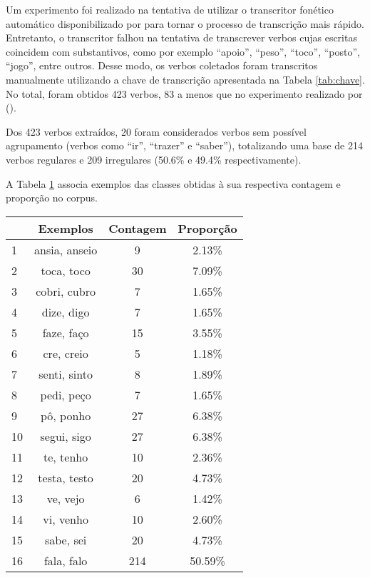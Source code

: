  Um experimento foi realizado na tentativa de utilizar o transcritor fonético automático disponibilizado por \cite{guide:2016} para tornar o processo de transcrição mais rápido. Entretanto, o transcritor falhou na tentativa de transcrever verbos cujas escritas coincidem com substantivos, como por exemplo “apoio”, “peso”, “toco”, “posto”, “jogo”, entre outros. Desse modo, os verbos coletados foram transcritos manualmente utilizando a chave de transcrição apresentada na Tabela \ref{tab:chave}. No total, foram obtidos 423 verbos, 83 a menos que no experimento realizado por (\cite{rumelhart:1986}).

Dos 423 verbos extraídos, 20 foram considerados verbos sem possível agrupamento (verbos como “ir”, “trazer” e “saber”), totalizando uma base de 214 verbos regulares e 209 irregulares (50.6\% e 49.4\% respectivamente). 

A Tabela \ref{tab:classes} associa exemplos das classes obtidas à sua respectiva contagem e proporção no corpus.

\begin{table}[H]
\begin{center}
\begin{tabular}{|l|c|c|c|}
\toprule
 & Exemplos & Contagem & Proporção\\
\midrule
1  & ansia, anseio & 9 & 2.13\%\\
2  & toca, toco & 30 & 7.09\%\\
3  & cobri, cubro & 7 & 1.65\%\\
4  & dize, digo & 7 & 1.65\%\\
5 & faze, faço & 15 & 3.55\%\\
6  & cre, creio & 5 & 1.18\%\\
7  & senti, sinto & 8 & 1.89\% \\
8  & pedi, peço & 7 & 1.65\%\\
9  & pô, ponho & 27 & 6.38\%\\
10  & segui, sigo & 27 & 6.38\%\\
11  & te, tenho & 10 & 2.36\%\\
12  & testa, testo & 20 & 4.73\%\\
13  & ve, vejo & 6 & 1.42\%\\
14  & vi, venho & 10 & 2.60\%\\
15 & sabe, sei & 20 & 4.73\%\\
16  & fala, falo & 214 & 50.59\%\\
\bottomrule
\end{tabular}
\end{center}
\label{tab:classes}
\end{table}


